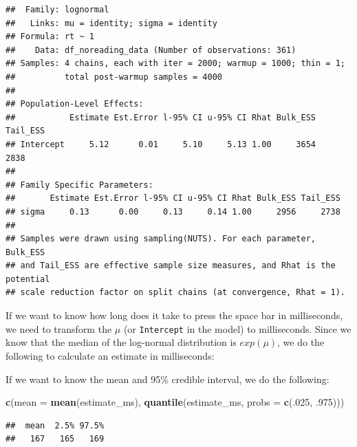 \documentclass[12pt,]{krantz}
\newenvironment{Shaded}{\begin{snugshade}}{\end{snugshade}}
\newcommand{\KeywordTok}[1]{\textcolor[rgb]{0.13,0.29,0.53}{\textbf{#1}}}
\newcommand{\DataTypeTok}[1]{\textcolor[rgb]{0.13,0.29,0.53}{#1}}
\newcommand{\DecValTok}[1]{\textcolor[rgb]{0.00,0.00,0.81}{#1}}
\newcommand{\FloatTok}[1]{\textcolor[rgb]{0.00,0.00,0.81}{#1}}
\newcommand{\StringTok}[1]{\textcolor[rgb]{0.31,0.60,0.02}{#1}}
\newcommand{\OperatorTok}[1]{\textcolor[rgb]{0.81,0.36,0.00}{\textbf{#1}}}
\newcommand{\NormalTok}[1]{#1}
\theoremstyle{definition}
\theoremstyle{definition}
\theoremstyle{definition}
\theoremstyle{remark}
\begin{document}
\begin{verbatim}
##  Family: lognormal 
##   Links: mu = identity; sigma = identity 
## Formula: rt ~ 1 
##    Data: df_noreading_data (Number of observations: 361) 
## Samples: 4 chains, each with iter = 2000; warmup = 1000; thin = 1;
##          total post-warmup samples = 4000
## 
## Population-Level Effects: 
##           Estimate Est.Error l-95% CI u-95% CI Rhat Bulk_ESS Tail_ESS
## Intercept     5.12      0.01     5.10     5.13 1.00     3654     2838
## 
## Family Specific Parameters: 
##       Estimate Est.Error l-95% CI u-95% CI Rhat Bulk_ESS Tail_ESS
## sigma     0.13      0.00     0.13     0.14 1.00     2956     2738
## 
## Samples were drawn using sampling(NUTS). For each parameter, Bulk_ESS
## and Tail_ESS are effective sample size measures, and Rhat is the potential
## scale reduction factor on split chains (at convergence, Rhat = 1).
\end{verbatim}

If we want to know how long does it take to press the space bar in
milliseconds, we need to transform the \(\mu\) (or \texttt{Intercept} in
the model) to milliseconds. Since we know that the median of the
log-normal distribution is \(exp(\mu)\), we do the following to
calculate an estimate in milliseconds:

\begin{Shaded}
\end{Shaded}

If we want to know the mean and 95\% credible interval, we do the
following:

\begin{Shaded}
\begin{Highlighting}[]
\KeywordTok{c}\NormalTok{(}\DataTypeTok{mean =} \KeywordTok{mean}\NormalTok{(estimate_ms), }\KeywordTok{quantile}\NormalTok{(estimate_ms, }\DataTypeTok{probs =} \KeywordTok{c}\NormalTok{(.}\DecValTok{025}\NormalTok{, }\FloatTok{.975}\NormalTok{)))}
\end{Highlighting}
\end{Shaded}

\begin{verbatim}
##  mean  2.5% 97.5% 
##   167   165   169
\end{verbatim}
\end{document}
